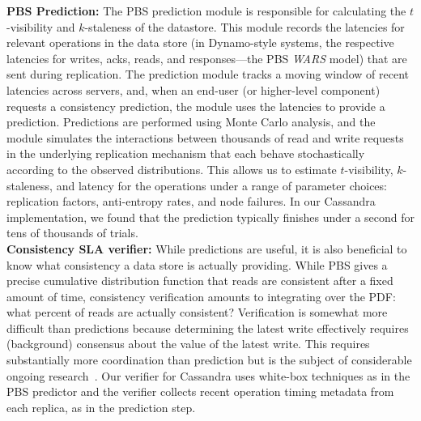 \textbf{PBS Prediction:} The PBS prediction module is responsible for
calculating the $t$-visibility and $k$-staleness of the
datastore. This module records the latencies for relevant operations
in the data store (in Dynamo-style systems, the respective latencies
for writes, acks, reads, and responses---the PBS \textit{WARS} model)
that are sent during replication.  The prediction module tracks a
moving window of recent latencies across servers, and, when an
end-user (or higher-level component) requests a consistency
prediction, the module uses the latencies to provide a
prediction. Predictions are performed using Monte Carlo analysis, and
the module simulates the interactions between thousands of read and
write requests in the underlying replication mechanism that each
behave stochastically according to the observed distributions. This
allows us to estimate $t$-visibility, $k$-staleness, and latency for
the operations under a range of parameter choices: replication
factors, anti-entropy rates, and node failures. In our Cassandra
implementation, we found that the prediction typically finishes under
a second for tens of thousands of trials.\\



\textbf{Consistency SLA verifier:} While predictions are useful, it is
also beneficial to know what consistency a data store is actually
providing. While PBS gives a precise cumulative distribution function
that reads are consistent after a fixed amount of time, consistency
verification amounts to integrating over the PDF: what percent of
reads are actually consistent? Verification is somewhat more difficult
than predictions because determining the latest write effectively
requires (background) consensus about the value of the latest
write. This requires substantially more coordination than prediction
but is the subject of considerable ongoing
research~\cite{hotdep}. Our verifier for Cassandra uses white-box
techniques as in the PBS predictor and the verifier collects recent
operation timing metadata from each replica, as in the prediction step.

